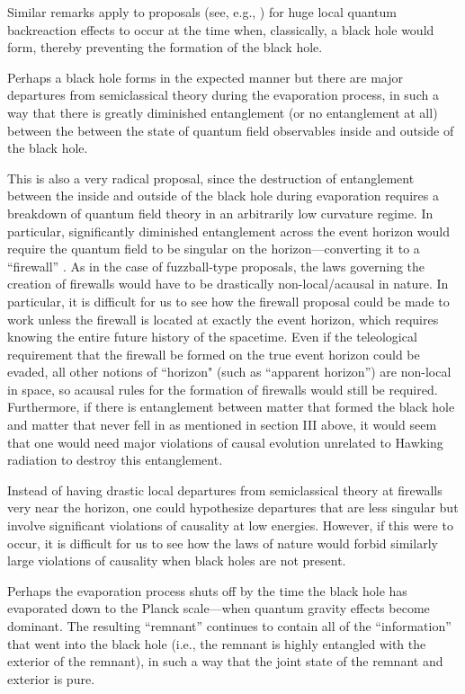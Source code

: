 \documentclass[12pt,nofootinbib,amsmath,amssymb,amsfonts,aps,prd,groupedaddress]{revtex4-1}
\begin{document}
Similar remarks apply to proposals (see, e.g., \cite{mh})
for huge local quantum 
backreaction effects 
to occur at the time when, classically, a black hole would form, thereby preventing the formation
of the black hole.

\medskip {} Perhaps a black hole forms in the
expected manner but there are major departures from semiclassical theory during
the evaporation process, in such a way that there is greatly diminished
entanglement (or no entanglement at all) between the between the state of
quantum field observables inside and outside of the black hole. 

This is also a very radical proposal, since the destruction of entanglement
between the inside and outside of the black hole during evaporation requires a
breakdown of quantum field theory in an arbitrarily low curvature regime. In
particular, significantly diminished entanglement across the event horizon would
require the quantum field to be singular on the horizon---converting it to a
``firewall'' \cite{amps}. As in the case of fuzzball-type proposals,
the laws governing the creation of firewalls would have to
be drastically non-local/acausal in nature. In particular, it is difficult for us to see
how the firewall proposal could be made to work unless the firewall is located at exactly
the event horizon, which requires knowing the entire future history of the spacetime.
Even if the teleological requirement that the firewall be formed on the true event
horizon could be evaded, all other notions of ``horizon" (such as ``apparent horizon'') are
non-local in space, so acausal rules for the formation of firewalls would still be required.
Furthermore, if there is entanglement between matter that formed the black hole and matter that never fell in as mentioned in section III above, it would seem that one would need major violations of causal evolution unrelated to Hawking radiation to destroy this entanglement.

Instead of having drastic local departures from semiclassical theory at firewalls very near the 
horizon, one could hypothesize
departures that are less singular \cite{gid} but involve significant violations of causality at low energies. However, if this were to occur, 
it is difficult for us to see how the laws of nature would forbid
similarly large violations of causality when black holes are not present.

\medskip {} Perhaps the evaporation process shuts off by the time
the black hole has evaporated down to the Planck scale---when quantum gravity
effects become dominant. The resulting ``remnant'' continues to contain all of
the ``information'' that went into the black hole (i.e., the remnant is highly
entangled with the exterior of the remnant), in such a way that the joint state
of the remnant and exterior is pure.
\end{document}
